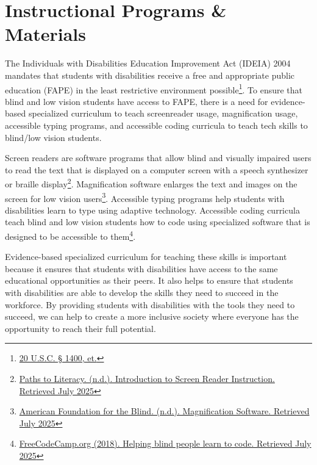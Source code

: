 \chapter{Instructional Programs \& Materials}\label{appx4}

The Individuals with Disabilities Education Improvement Act (IDEIA) 2004 mandates that students with disabilities receive a free and appropriate public education (FAPE) in the least restrictive environment possible\footnote{\raggedright \href{http://sites.ed.gov/idea/statuteregulations/}{20 U.S.C. § 1400, et.}}. To ensure that blind and low vision students have access to FAPE, there is a need for evidence-based specialized curriculum to teach screenreader usage, magnification usage, accessible typing programs, and accessible coding curricula to teach tech skills to blind/low vision students.

Screen readers are software programs that allow blind and visually impaired users to read the text that is displayed on a computer screen with a speech synthesizer or braille display\footnote{\raggedright \href{https://www.pathstoliteracy.org/resource/introduction-screen-reader-instruction/}{Paths to Literacy. (n.d.). Introduction to Screen Reader Instruction. Retrieved July 2025}}. Magnification software enlarges the text and images on the screen for low vision users\footnote{\raggedright \href{https://www.afb.org/blindness-and-low-vision/using-technology/assistive-technology-videos/magnification-software}{American Foundation for the Blind. (n.d.). Magnification Software. Retrieved July 2025}}. Accessible typing programs help students with disabilities learn to type using adaptive technology. Accessible coding curricula teach blind and low vision students how to code using specialized software that is designed to be accessible to them\footnote{\raggedright \href{https://www.freecodecamp.org/news/helping-blind-people-learn-to-code-c47c68d4a237/}{FreeCodeCamp.org (2018). Helping blind people learn to code. Retrieved July 2025}}.

Evidence-based specialized curriculum for teaching these skills is important because it ensures that students with disabilities have access to the same educational opportunities as their peers. It also helps to ensure that students with disabilities are able to develop the skills they need to succeed in the workforce. By providing students with disabilities with the tools they need to succeed, we can help to create a more inclusive society where everyone has the opportunity to reach their full potential.

